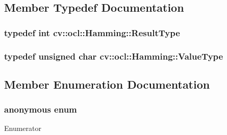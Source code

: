 \subsection{Member Typedef Documentation}
\hypertarget{structcv_1_1ocl_1_1Hamming_aff9c33cfa8fbfc780580008bf7809b03}{
\subsubsection[{Result\-Type}]{\setlength{\rightskip}{0pt plus 5cm}typedef int {\bf cv\-::ocl\-::\-Hamming\-::\-Result\-Type}}}\label{structcv_1_1ocl_1_1Hamming_aff9c33cfa8fbfc780580008bf7809b03}
\hypertarget{structcv_1_1ocl_1_1Hamming_aa130804c2706b7f6b6d6dbfb80ab42af}{
\subsubsection[{Value\-Type}]{\setlength{\rightskip}{0pt plus 5cm}typedef unsigned char {\bf cv\-::ocl\-::\-Hamming\-::\-Value\-Type}}}\label{structcv_1_1ocl_1_1Hamming_aa130804c2706b7f6b6d6dbfb80ab42af}


\subsection{Member Enumeration Documentation}
\hypertarget{structcv_1_1ocl_1_1Hamming_a71fe89e46efcfdaa1f7f2e1650cdf422}{\subsubsection[{anonymous enum}]{\setlength{\rightskip}{0pt plus 5cm}anonymous enum}}\label{structcv_1_1ocl_1_1Hamming_a71fe89e46efcfdaa1f7f2e1650cdf422}
\begin{Desc}
\item[Enumerator]\par
\begin{description}
\item[{\em 
\hypertarget{structcv_1_1ocl_1_1Hamming_a71fe89e46efcfdaa1f7f2e1650cdf422ad77feba5d76d67db671e6d229aadaa2a}{norm\-Type}\label{structcv_1_1ocl_1_1Hamming_a71fe89e46efcfdaa1f7f2e1650cdf422ad77feba5d76d67db671e6d229aadaa2a}
}]\end{description}
\end{Desc}


